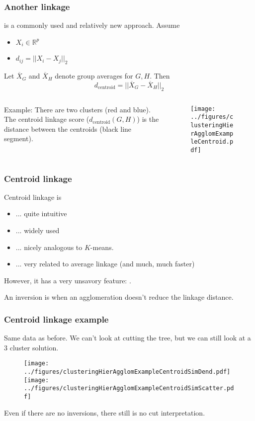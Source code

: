 \documentclass{beamer}
\begin{document}
\begin{frame}
\frametitle{Another linkage}
 is a commonly used and relatively new approach.  
Assume 
\begin{itemize}
\item $X_i \in \mathbb{R}^p$
\item $d_{ij} = ||X_i - X_j||_2$
\end{itemize}
\vsp

Let $\overline{X}_G$ and $\overline{X}_H$ denote group averages for $G,H$. Then
\[
d_{\textrm{centroid}} = ||\overline{X}_G - \overline{X}_H||_2
\]

\begin{columns}[T]
\begin{column}{.48\textwidth}
\vsp
\vsp
Example: There are two clusters (red and blue).  The centroid linkage
score ($d_{\textrm{centroid}}(G,H)$) is the distance between the centroids (black line segment).
\end{column}
\begin{column}{.48\textwidth}
\begin{figure}[h!]
  \centering
  \texttt{[image: ../figures/clusteringHierAgglomExampleCentroid.pdf]}
\end{figure}
\end{column}
\end{columns}
\end{frame}

\begin{frame}
\frametitle{Centroid linkage}
Centroid linkage is
\begin{itemize}
\item  ... quite intuitive
\item ... widely used
\item ... nicely analogous to $K$-means.
\item ... very related to average linkage (and much, much faster)
\end{itemize}
However, it has a very unsavory feature: .

\vsp
An inversion is when an agglomeration doesn't reduce the linkage distance.
\end{frame}

\begin{frame}
\frametitle{Centroid linkage example}
Same data as before.  We can't look at cutting the tree, but we can still look at a 3 cluster solution.
\begin{figure}[h!]
  \centering
  \texttt{[image: ../figures/clusteringHierAgglomExampleCentroidSimDend.pdf]}
  \texttt{[image: ../figures/clusteringHierAgglomExampleCentroidSimScatter.pdf]}  
\end{figure}
 Even if there are no inversions, there still is no cut interpretation.

\end{frame}
\end{document}
